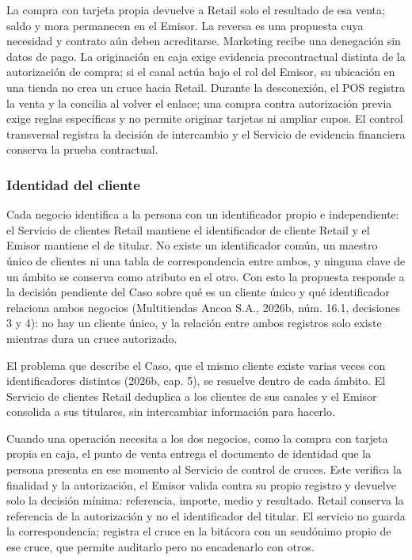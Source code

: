 \documentclass[11pt]{article}
\begin{document}
{La compra con tarjeta propia devuelve a Retail solo el resultado de esa venta; saldo y mora permanecen en el Emisor. La reversa es una propuesta cuya necesidad y contrato aún deben acreditarse. Marketing recibe una denegación sin datos de pago. La originación en caja exige evidencia precontractual distinta de la autorización de compra; si el canal actúa bajo el rol del Emisor, su ubicación en una tienda no crea un cruce hacia Retail. Durante la desconexión, el POS registra la venta y la concilia al volver el enlace; una compra contra autorización previa exige reglas específicas y no permite originar tarjetas ni ampliar cupos. El control transversal registra la decisión de intercambio y el Servicio de evidencia financiera conserva la prueba contractual.}

\subsubsection{Identidad del cliente}

{Cada negocio identifica a la persona con un identificador propio e independiente: el Servicio de clientes Retail mantiene el identificador de cliente Retail y el Emisor mantiene el de titular. No existe un identificador común, un maestro único de clientes ni una tabla de correspondencia entre ambos, y ninguna clave de un ámbito se conserva como atributo en el otro. Con esto la propuesta responde a la decisión pendiente del Caso sobre qué es un cliente único y qué identificador relaciona ambos negocios (Multitiendas Ancoa S.A., 2026b, núm. 16.1, decisiones 3 y 4): no hay un cliente único, y la relación entre ambos registros solo existe mientras dura un cruce autorizado.}

{El problema que describe el Caso, que el mismo cliente existe varias veces con identificadores distintos (2026b, cap. 5), se resuelve dentro de cada ámbito. El Servicio de clientes Retail deduplica a los clientes de sus canales y el Emisor consolida a sus titulares, sin intercambiar información para hacerlo.}

{Cuando una operación necesita a los dos negocios, como la compra con tarjeta propia en caja, el punto de venta entrega el documento de identidad que la persona presenta en ese momento al Servicio de control de cruces. Este verifica la finalidad y la autorización, el Emisor valida contra su propio registro y devuelve solo la decisión mínima: referencia, importe, medio y resultado. Retail conserva la referencia de la autorización y no el identificador del titular. El servicio no guarda la correspondencia; registra el cruce en la bitácora con un seudónimo propio de ese cruce, que permite auditarlo pero no encadenarlo con otros.}
\end{document}

